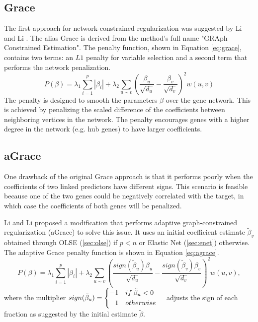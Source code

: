 \subsection{Grace} \label{sec:grace}
The first approach for network-constrained regularization was suggested by Li and Li \cite{li2008network}. The alias Grace is derived from the method's full name "GRAph Constrained Estimation". The penalty function, shown in Equation \ref{eq:grace}, contains two terms: an $L1$ penalty for variable selection and a second term that performs the network penalization.  
\begin{equation} \label{eq:grace}
P(\beta) = \lambda_1\sum_{i=1}^{p}\left|\beta_i\right| + \lambda_2\sum_{u \sim v}\left(\frac{\beta_u}{\sqrt{d_u}}-\frac{\beta_v}{\sqrt{d_v}}\right)^2w(u,v)
\end{equation}
The penalty is designed to smooth the parameters $\beta$ over the gene network. This is achieved by penalizing the scaled difference of the coefficients between neighboring vertices in the network. The penalty encourages genes with a higher degree in the network (e.g. hub genes) to have larger coefficients.


\subsection{aGrace} \label{sec:agrace}
One drawback of the original Grace approach is that it performs poorly when the coefficients of two linked predictors have different signs. This scenario is feasible because one of the two genes could be negatively correlated with the target, in which case the coefficients of both genes will be penalized.  

Li and Li proposed a modification \cite{li2010variable} that performs adaptive graph-constrained regularization (aGrace) to solve this issue. It uses an initial coefficient estimate $\tilde{\beta}_v$ obtained through OLSE (\ref{sec:olse}) if $p<n$ or Elastic Net (\ref{sec:enet}) otherwise. The adaptive Grace penalty function is shown in Equation \ref{eq:agrace}.
\begin{equation} \label{eq:agrace}
P(\beta) = \lambda_1\sum_{i=1}^{p}\left|\beta_i\right| + \lambda_2\sum_{u \sim v}\left(\frac{sign(\tilde{\beta}_u)\beta_u}{\sqrt{d_u}}-\frac{sign(\tilde{\beta}_v)\beta_v}{\sqrt{d_v}}\right)^2w(u,v),
\end{equation}
where the multiplier $sign(\tilde{\beta}_u) = \left\{ \begin{aligned} -1 &\quad if \: \tilde{\beta}_u < 0 \cr 1 &\quad otherwise \end{aligned} \right.$ adjusts the sign of each fraction as suggested by the initial estimate $\tilde{\beta}$.


